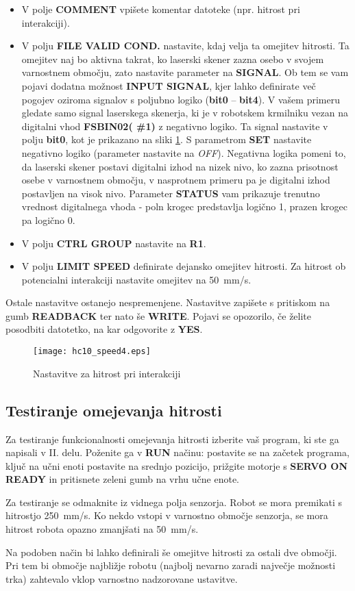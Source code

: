 \begin{itemize}
	\item V polje \textbf{COMMENT} vpišete komentar datoteke (npr. hitrost pri interakciji).
	\item V polju \textbf{FILE VALID COND.} nastavite, kdaj velja ta omejitev hitrosti. Ta  omejitev naj bo aktivna takrat, ko laserski skener zazna osebo v svojem varnostnem območju, zato nastavite parameter na \textbf{SIGNAL}. Ob tem se vam pojavi dodatna možnost \textbf{INPUT SIGNAL}, kjer lahko definirate več pogojev oziroma signalov s poljubno logiko (\textbf{bit0} -- \textbf{bit4}). V vašem primeru gledate samo signal laserskega skenerja, ki je v robotskem krmilniku vezan na digitalni vhod  \textbf{FSBIN02( \#1)} z negativno logiko. Ta signal nastavite v polju \textbf{bit0}, kot je prikazano na sliki \ref{fig:hc10_speed4}. S parametrom \textbf{SET} nastavite negativno logiko (parameter nastavite na \emph{OFF}). Negativna logika pomeni to, da laserski skener postavi digitalni izhod na nizek nivo, ko zazna prisotnost osebe v varnostnem območju, v nasprotnem primeru pa je digitalni izhod postavljen na visok nivo. Parameter \textbf{STATUS} vam prikazuje trenutno vrednost digitalnega vhoda - poln krogec predstavlja logično 1, prazen krogec pa logično 0.
	\item V polju \textbf{CTRL GROUP} nastavite na \textbf{R1}.
	\item V polju \textbf{LIMIT SPEED} definirate dejansko omejitev hitrosti. Za hitrost ob potencialni interakciji nastavite omejitev na 50~mm/s.
\end{itemize}

Ostale nastavitve ostanejo nespremenjene. Nastavitve zapišete s pritiskom na gumb \textbf{READBACK} ter nato še \textbf{WRITE}. Pojavi se opozorilo, če želite posodbiti datotetko, na kar odgovorite z \textbf{YES}.

\begin{figure}[!hbt]
	\centering
	\texttt{[image: hc10\_speed4.eps]}
	\caption{Nastavitve za hitrost pri interakciji}
	\label{fig:hc10_speed4}
\end{figure}

\subsection{Testiranje omejevanja hitrosti} \label{test3del}

Za testiranje funkcionalnosti omejevanja hitrosti izberite vaš program, ki ste ga napisali v II. delu. Poženite ga v \textbf{RUN} načinu: postavite se na začetek programa, ključ na učni enoti postavite na srednjo pozicijo, prižgite motorje s \textbf{SERVO ON READY} in pritisnete zeleni gumb na vrhu učne enote.

Za testiranje se odmaknite iz vidnega polja senzorja. Robot se mora premikati s hitrostjo 250~mm/s. Ko nekdo vstopi v varnostno območje senzorja, se mora hitrost robota opazno zmanjšati na 50~mm/s.

Na podoben način bi lahko definirali še omejitve hitrosti za ostali dve območji. Pri tem bi območje najbližje robotu (najbolj nevarno zaradi največje možnosti trka) zahtevalo vklop varnostno nadzorovane ustavitve.



